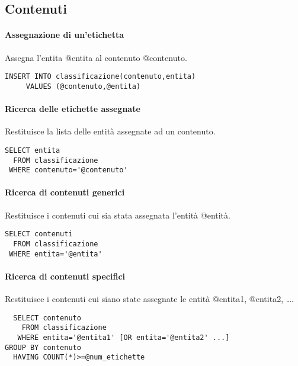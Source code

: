 \subsection*{Contenuti}
\paragraph{Assegnazione di un'etichetta}
Assegna l'entita \textsf{@entita} al contenuto \textsf{@contenuto}.
\begin{verbatim}
INSERT INTO classificazione(contenuto,entita)
     VALUES (@contenuto,@entita)
\end{verbatim}

\paragraph{Ricerca delle etichette assegnate}
Restituisce la lista delle entità assegnate ad un contenuto.
\begin{verbatim}
SELECT entita
  FROM classificazione
 WHERE contenuto='@contenuto'
\end{verbatim}

\paragraph{Ricerca di contenuti generici}
Restituisce i contenuti cui sia stata assegnata l'entità \textsf{@entità}.
\begin{verbatim}
SELECT contenuti
  FROM classificazione
 WHERE entita='@entita'
\end{verbatim}

\paragraph{Ricerca di contenuti specifici}
Restituisce i contenuti cui siano state assegnate le entità \textsf{@entita1}, \textsf{@entita2}, \ldots .
\begin{verbatim}
  SELECT contenuto
    FROM classificazione
   WHERE entita='@entita1' [OR entita='@entita2' ...]
GROUP BY contenuto
  HAVING COUNT(*)>=@num_etichette
\end{verbatim}
